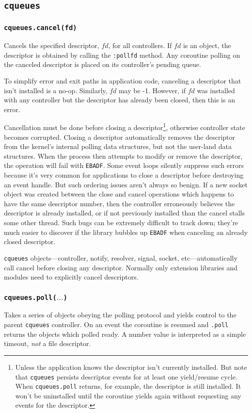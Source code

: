 \documentclass[11pt, oneside]{memoir}
\newcommand*{\cqueues}[0]{\texttt{cqueues}\xspace}
\newcommand*{\routine}[1]{\texttt{#1}\xspace}
\newcommand*{\fn}[1]{\texttt{#1}\xspace}
\newcommand*{\method}[1]{\texttt{#1}\xspace}
\newcounter{toccols}
\newenvironment{Module}[1]{
	\subsection{\texttt{#1}}
	\addtocontents{toc}{
		\protect\begin{multicols}{\value{toccols}}
	}
}{
	\addtocontents{toc}{\protect\end{multicols}}
}
\begin{document}
\begin{Module}{\cqueues}
\subsubsection[\routine{cqueues.cancel}]{\routine{cqueues.cancel(fd)}}
Cancels the specified descriptor, $fd$, for all controllers. If $fd$ is an object, the descriptor is obtained by calling the \method{:pollfd} method. Any coroutine polling on the canceled descriptor is placed on its controller's pending queue.

To simplify error and exit paths in application code, canceling a descriptor that isn't installed is a no-op. Similarly, $fd$ may be -1. However, if $fd$ was installed with any controller but the descriptor has already been closed, then this is an error.

Cancellation must be done before closing a descriptor\footnote{Unless the application knows the descriptor isn't currently installed. But note that \cqueues persists descriptor events for at least one yield/resume cycle. When \method{cqueues.poll} returns, for example, the descriptor is still installed. It won't be uninstalled until the coroutine yields again without requesting any events for the descriptor.}, otherwise controller state becomes corrupted. Closing a descriptor automatically removes the descriptor from the kernel's internal polling data structures, but not the user-land data structures. When the process then attempts to modify or remove the descriptor, the operation will fail with \texttt{EBADF}. Some event loops silently suppress such errors because it's very common for applications to close a descriptor before destroying an event handle. But such ordering issues aren't always so benign. If a new socket object was created between the close and cancel operations which happens to have the same descriptor number, then the controller erroneously believes the descriptor is already installed, or if not previously installed than the cancel stalls some other thread. Such bugs can be extremely difficult to track down; they're much easier to discover if the library bubbles up \texttt{EBADF} when canceling an already closed descriptor.

\cqueues objects---controller, notify, resolver, signal, socket, etc---automatically call cancel before closing any descriptor. Normally only extension libraries and modules need to explicitly cancel descriptors.

\subsubsection[\routine{cqueues.poll}]{\routine{cqueues.poll($\ldots$)}}
Takes a series of objects obeying the polling protocol and yields control to the parent \cqueues controller. On an event the coroutine is resumed and \fn{.poll} returns the objects which polled ready. A number value is interpreted as a simple timeout, \emph{not} a file descriptor.


\end{Module}
\end{document}
